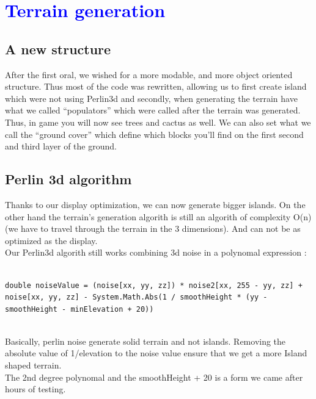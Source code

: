 \documentclass[article]{report}             %
\begin{document}
		\chapter{\textcolor{blue}{Terrain generation}}
			\section{A new structure}
				After the first oral, we wished for a more modable, and more object oriented structure. Thus most of the code was rewritten, allowing us to first create island which were not using Perlin3d and secondly, when generating the terrain have what we called \enquote{populators} which were called after the terrain was generated.\\

				Thus, in game you will now see trees and cactus as well. We can also set what we call the \enquote{ground cover} which define which blocks you'll find on the first second and third layer of the ground. 
				
			\section{Perlin 3d algorithm}
				Thanks to our display optimization, we can now generate bigger islands. On the other hand the terrain's generation algorith is still an algorith of complexity O(n) (we have to travel through the terrain in the 3 dimensions). And can not be as optimized as the display.\\



				Our Perlin3d algorith still works combining 3d noise in a polynomal expression :

				\begin{lstlisting}

double noiseValue = (noise[xx, yy, zz]) * noise2[xx, 255 - yy, zz] + noise[xx, yy, zz] - System.Math.Abs(1 / smoothHeight * (yy - smoothHeight - minElevation + 20))

				\end{lstlisting} 
~\\

				Basically, perlin noise generate solid terrain and not islands. Removing the absolute value of 1/elevation to the noise value ensure that we get a more Island shaped terrain.\\
				The 2nd degree polynomal and the smoothHeight + 20 is a form we came after hours of testing. \\
\end{document}
